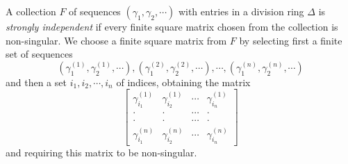 A collection $F$ of sequences $(\gamma_1, \gamma_2, \cdots)$ with entries in a division ring $\Delta$ is \textit{strongly independent} if every finite square matrix chosen from the collection is non-singular. We choose a finite square matrix from $F$ by selecting first a finite set of sequences
$$(\gamma_1^{(1)}, \gamma_2^{(1)}, \cdots), (\gamma_1^{(2)}, \gamma_2^{(2)}, \cdots), \cdots, (\gamma_1^{(n)}, \gamma_2^{(n)}, \cdots)$$
and then a set $i_1, i_2, \cdots, i_n$ of indices, obtaining the matrix
$$\begin{bmatrix}
\gamma_{i_1}^{(1)} & \gamma_{i_2}^{(1)} & \cdots & \gamma_{i_n}^{(1)} \\
\cdot & \cdot & \cdots & \cdot \\
\cdot & \cdot & \cdots & \cdot \\
\gamma_{i_1}^{(n)} & \gamma_{i_2}^{(n)} & \cdots & \gamma_{i_n}^{(n)}
\end{bmatrix}$$
and requiring this matrix to be non-singular.

